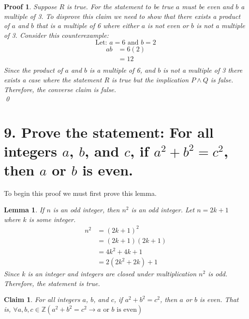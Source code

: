 \documentclass{article}
\newtheorem*{claim}{Claim}
\newtheorem{lemma}{Lemma}
\newtheorem*{myproof}{Proof}
\begin{document}
\begin{myproof}
Suppose $R$ is true. For the statement to be true $a$ must be even and $b$ a multiple of 3. To disprove this claim we need to show that there exists a product of $a$ and $b$ that is a multiple of 6 where either $a$ is not even or $b$ is not a multiple of 3. Consider this counterexample:
$$\text{Let: } a = 6 \text{ and } b = 2 $$
\begin{align*}
       ab &= 6(2) \\
       &= 12 \\
\end{align*}
Since the product of $a$ and $b$ is a multiple of 6, and $b$ is not a multiple of 3 there exists a case where the statement $R$ is true but the implication $P \wedge Q$ is false. Therefore, the converse claim is false. \\
\qed
\end{myproof}

\newpage

\section*{9. Prove the statement: For all integers $a$, $b$, and $c$, if $a^2+b^2=c^2$, then $a$ or $b$ is even.}
To begin this proof we must first prove this lemma.
\begin{lemma}
    If $n$ is an odd integer, then $n^2$ is an odd integer. Let $n = 2k+1$ where $k$ is some integer.
    \begin{align*}
        n^2 &= (2k+1)^2 \\
        &= (2k+1)(2k+1) \\ 
        &= 4k^2+4k+1 \\
        &= 2(2k^2+2k)+1
    \end{align*}
    Since $k$ is an integer and integers are closed under multiplication $n^2$ is odd. Therefore, the statement is true.
\end{lemma}
\begin{claim}
    For all integers $a$, $b$, and $c$, if $a^2+b^2=c^2$, then $a$ or $b$ is even. That is, $\forall a,b,c \in \mathbb{Z}(a^2+b^2=c^2 \rightarrow a \text{ or } b \text{ is even})$
\end{claim}
\end{document}
